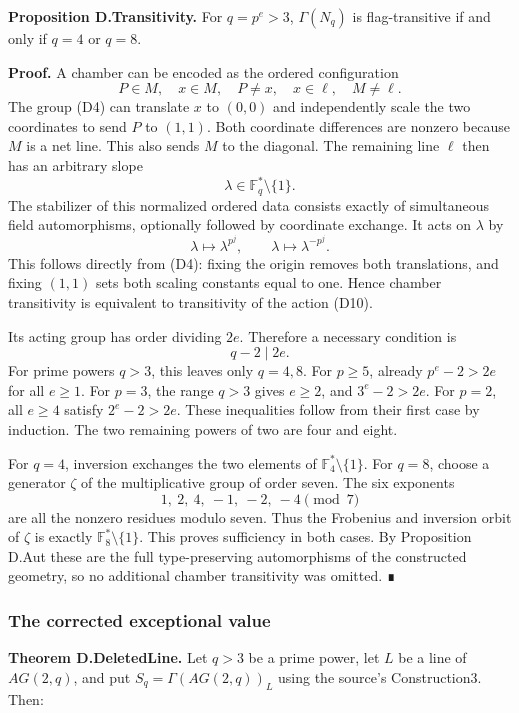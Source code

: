\textbf{Proposition D.Transitivity.} For \(q=p^e>3\), \(\Gamma(N_q)\) is
flag-transitive if and only if \(q=4\) or \(q=8\).

\textbf{Proof.} A chamber can be encoded as the ordered configuration \[
P\in M,\quad x\in M,\quad P\ne x,\quad x\in\ell,\quad M\ne\ell.
\] The group (D4) can translate \(x\) to \((0,0)\) and independently
scale the two coordinates to send \(P\) to \((1,1)\). Both coordinate
differences are nonzero because \(M\) is a net line. This also sends
\(M\) to the diagonal. The remaining line \(\ell\) then has an arbitrary
slope \[
\lambda\in\mathbb F_q^*\setminus\{1\}.
\] The stabilizer of this normalized ordered data consists exactly of
simultaneous field automorphisms, optionally followed by coordinate
exchange. It acts on \(\lambda\) by \[
\lambda\longmapsto\lambda^{p^j},\qquad
\lambda\longmapsto\lambda^{-p^j}.
\tag{D10}
\] This follows directly from (D4): fixing the origin removes both
translations, and fixing \((1,1)\) sets both scaling constants equal to
one. Hence chamber transitivity is equivalent to transitivity of the
action (D10).

Its acting group has order dividing \(2e\). Therefore a necessary
condition is \[
q-2\mid2e.
\tag{D11}
\] For prime powers \(q>3\), this leaves only \(q=4,8\). For \(p\ge5\),
already \(p^e-2>2e\) for all \(e\ge1\). For \(p=3\), the range \(q>3\)
gives \(e\ge2\), and \(3^e-2>2e\). For \(p=2\), all \(e\ge4\) satisfy
\(2^e-2>2e\). These inequalities follow from their first case by
induction. The two remaining powers of two are four and eight.

For \(q=4\), inversion exchanges the two elements of
\(\mathbb F_4^*\setminus\{1\}\). For \(q=8\), choose a generator
\(\zeta\) of the multiplicative group of order seven. The six exponents
\[
1,\ 2,\ 4,\ -1,\ -2,\ -4\pmod7
\] are all the nonzero residues modulo seven. Thus the Frobenius and
inversion orbit of \(\zeta\) is exactly \(\mathbb F_8^*\setminus\{1\}\).
This proves sufficiency in both cases. By Proposition D.Aut these are
the full type-preserving automorphisms of the constructed geometry, so
no additional chamber transitivity was omitted. ∎

\subsubsection{The corrected exceptional
value}\label{the-corrected-exceptional-value}

\textbf{Theorem D.DeletedLine.} Let \(q>3\) be a prime power, let \(L\)
be a line of \(AG(2,q)\), and put \(S_q=\Gamma(AG(2,q))_L\) using the
source's Construction3. Then:

